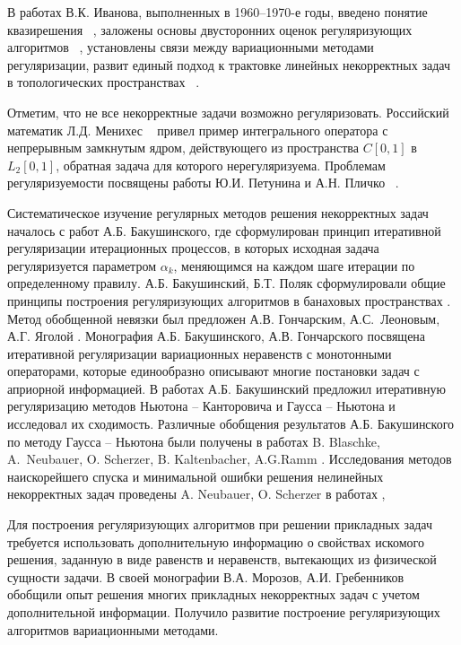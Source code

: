 {В работах В.К. Иванова, выполненных в 1960--1970-е годы, введено понятие квазирешения ~\cite{Iv1962_2, Iv1963},  заложены основы двусторонних оценок регуляризующих алгоритмов ~\cite{Iv1966}, установлены связи между вариационными методами регуляризации, развит единый подход к трактовке линейных некорректных задач в топологических пространствах ~\cite{Iv1967}. 

Отметим, что не все некорректные задачи возможно регуляризовать. Российский математик Л.Д. Менихес ~\cite{Menih1978} привел пример интегрального оператора с непрерывным замкнутым ядром, действующего из пространства \( C[0,1] \) в \( L_2[0,1] \), обратная задача для которого нерегуляризуема. Проблемам регуляризуемости посвящены работы Ю.И. Петунина и А.Н. Пличко ~\cite{PetPlich1980}.

Систематическое изучение регулярных методов решения некорректных задач началось с работ А.Б. Бакушинского, где сформулирован принцип итеративной регуляризации итерационных процессов, в которых исходная задача регуляризуется параметром $\alpha_k$, меняющимся на каждом шаге итерации по определенному правилу. А.Б. Бакушинский, Б.Т. Поляк сформулировали общие принципы построения регуляризующих алгоритмов в банаховых пространствах \cite{BakPol1974}. Метод обобщенной невязки был предложен А.В. Гончарским, А.С.~Леоновым, А.Г. Яголой \cite{GonLeoYag1973}. Монография А.Б. Бакушинского, А.В. Гончарского \cite{BakGon1989} посвящена итеративной регуляризации вариационных неравенств с монотонными операторами, которые единообразно описывают многие постановки задач с априорной информацией. В работах \cite{Bak1976,Bak1992} А.Б. Бакушинский предложил итеративную регуляризацию методов Ньютона -- Канторовича и Гаусса -- Ньютона и исследовал их сходимость. Различные обобщения результатов А.Б. Бакушинского по методу Гаусса -- Ньютона были получены в работах B. Blaschke, A.~Neubauer, O. Scherzer, B. Kaltenbacher, A.G.Ramm \cite{BlaNeuSch1997,KalNeuRam2002}. Исследования методов наискорейшего спуска и минимальной ошибки решения нелинейных некорректных задач проведены A. Neubauer, O. Scherzer в работах  \cite{NeuSch1995_1,NeuSch1995_2,Sch1995},

Для построения регуляризующих алгоритмов при решении прикладных задач требуется использовать дополнительную информацию о свойствах искомого решения, заданную в виде равенств и неравенств, вытекающих из физической сущности задачи. В своей монографии \cite{MorGre1992} В.А. Морозов, А.И. Гребенников обобщили опыт решения многих прикладных  некорректных задач с учетом дополнительной информации. Получило развитие построение регуляризующих алгоритмов вариационными методами. 

}
